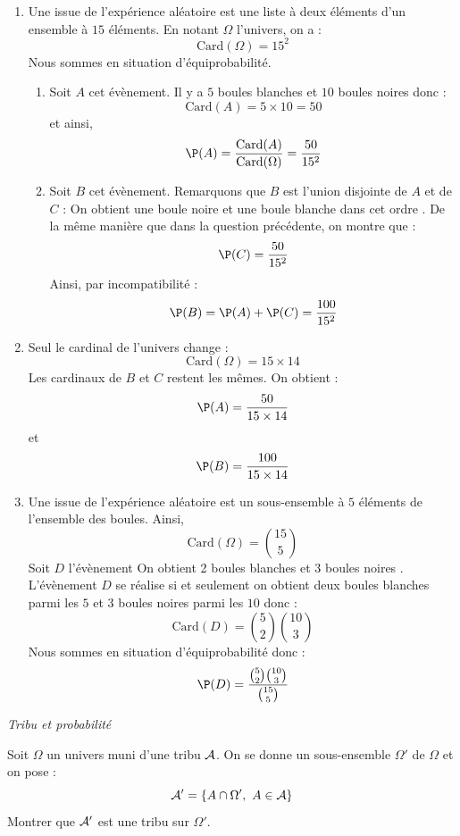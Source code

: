 \documentclass[a4paper,10pt]{report}
\begin{document}
\corr 

\begin{enumerate}
\item Une issue de l'expérience aléatoire est une liste à deux éléments d'un ensemble à $15$ éléments. En notant $\Omega$ l'univers, on a :
$$ \textrm{Card}(\Omega)= 15^2$$
Nous sommes en situation d'équiprobabilité.

\begin{enumerate}
\item Soit $A$ cet évènement. Il y a $5$ boules blanches et $10$ boules noires donc :
$$ \textrm{Card}(A)= 5 \times 10 = 50$$
et ainsi,
$$ \P(A) = \dfrac{\textrm{Card}(A)}{\textrm{Card}(\Omega)} = \dfrac{50}{15^2}$$
\item Soit $B$ cet évènement. Remarquons que $B$ est l'union disjointe de $A$ et de $C$ : \og On obtient une boule noire et une boule blanche dans cet ordre \fg. De la même manière que dans la question précédente, on montre que :
$$ \P(C) = \dfrac{50}{15^2}$$
Ainsi, par incompatibilité :
$$ \P(B) = \P(A)+ \P(C) = \dfrac{100}{15^2}$$
\end{enumerate}
\item Seul le cardinal de l'univers change : 
$$ \textrm{Card}(\Omega)= 15 \times 14$$
Les cardinaux de $B$ et $C$ restent les mêmes. On obtient :
$$ \P(A)   = \dfrac{50}{15 \times 14}$$
et 
$$ \P(B)   = \dfrac{100}{15 \times 14}$$
\item Une issue de l'expérience aléatoire est un sous-ensemble à $5$ éléments de l'ensemble des boules. Ainsi,
$$ \textrm{Card}(\Omega)= \binom{15}{5} $$
Soit $D$ l'évènement \og On obtient 2 boules blanches et 3 boules noires \fg. L'évènement $D$ se réalise si et seulement on obtient deux boules blanches parmi les $5$ et $3$ boules noires parmi les $10$ donc :
$$ \textrm{Card}(D) = \binom{5}{2} \binom{10}{3}$$
Nous sommes en situation d'équiprobabilité donc :
$$ \P(D) = \dfrac{\binom{5}{2} \binom{10}{3}}{\binom{15}{5}}$$
\end{enumerate}

\newpage


\medskip

\begin{center}
\textit{{ {\large Tribu et probabilité}}}
\end{center}

\medskip


\begin{Exa} Soit $\Omega$ un univers muni d'une tribu ${\cal A}$. On se donne un sous-ensemble $\Omega'$ de $\Omega$ et on pose :
 $${\cal A}'=\{A\cap \Omega',\ A\in{\cal A}\}$$
Montrer que ${\cal A}'$ est une tribu sur $\Omega'.$
\end{Exa}
\end{document}

